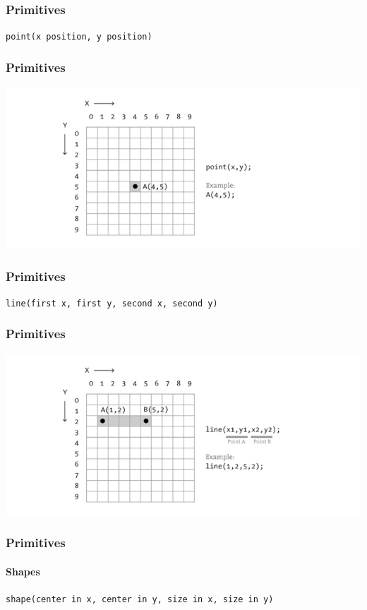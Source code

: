 \documentclass[xcolor=dvipsnames]{beamer}
\begin{document}
\begin{frame}
\frametitle{Primitives}
\begin{center}
{\tt point(x position, y position)}
\end{center}
\end{frame}

\begin{frame}
\frametitle{Primitives}
\begin{center}
\includegraphics[width=\linewidth]{point.jpg}
\end{center}
\end{frame}

\begin{frame}
\frametitle{Primitives}
\begin{center}
{\tt line(first x, first y, second x, second y)}
\end{center}
\end{frame}

\begin{frame}
\frametitle{Primitives}
\begin{center}
\includegraphics[width=\linewidth]{line.jpg}
\end{center}
\end{frame}

\begin{frame}
\frametitle{Primitives}
\framesubtitle{Shapes}
\begin{center}
{\tt shape(center in x, center in y, size in x, size in y)}
\end{center}
\end{frame}
\end{document}
